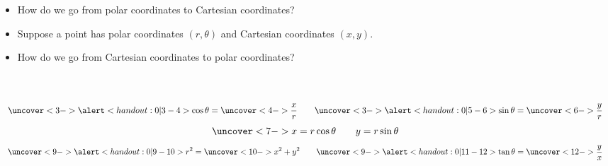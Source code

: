 \begin{frame}
\begin{itemize}
\item  How do we go from polar coordinates to Cartesian coordinates?
\item<2->  Suppose a point has polar coordinates $(r, \theta )$ and Cartesian coordinates $(x,y)$.
\item<8->  How do we go from Cartesian coordinates to polar coordinates?
\end{itemize}
\begin{columns}[c]
\ %
\[
\uncover<3->{%
\alert<handout:0| 3-4>{\cos\theta = \uncover<4->{\frac{x}{r}}}\qquad %
}%
\uncover<3->{%
\alert<handout:0| 5-6>{\sin\theta = \uncover<6->{\frac{y}{r}}}%
}%
\]
\[
\uncover<7->{%
x = r\cos \theta \qquad y = r\sin \theta
}%
\]
\[
\uncover<9->{%
\alert<handout:0| 9-10>{r^2 = \uncover<10->{x^2 + y^2}}\qquad %
}%
\uncover<9->{%
\alert<handout:0| 11-12>{\tan\theta = \uncover<12->{\frac{y}{x}}}%
}%
\]
\end{columns}
\end{frame}
